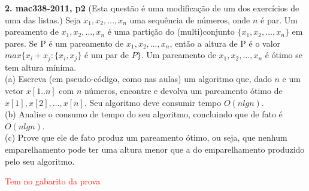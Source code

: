 
\noindent \textbf{2. mac338-2011, p2} (Esta questão é uma modificação de um dos exercícios de uma das listas.) Seja $x_1, x_2, \ldots , x_n$ uma sequência de números, onde $n$ é par. Um pareamento de $x_1, x_2, \ldots , x_n$ é uma partição do (multi)conjunto $\{x_1, x_2, \ldots , x_n\}$ em pares. Se P é um pareamento de $x_1, x_2, \ldots , x_n$, então a altura de P é o valor $max\{x_i+x_j : \{x_i, x_j\}$ é um par de $P\}$. Um pareamento de $x_1, x_2, \ldots , x_n$ é ótimo se tem altura mínima.\\[6pt]

\noindent (a) Escreva (em pseudo-código, como nas aulas) um algoritmo que, dado $n$ e um vetor $x[1..n]$ com $n$ números, encontre e devolva um pareamento ótimo de $x[1], x[2], \dots , x[n]$. Seu algoritmo deve
consumir tempo $O(n lg n)$.\\[2pt]
(b) Analise o consumo de tempo do seu algoritmo, concluindo que de fato é $O(n lg n)$.\\[2pt]
(c) Prove que ele de fato produz um pareamento ótimo, ou seja, que nenhum emparelhamento pode ter uma altura menor que a do emparelhamento produzido pelo seu algoritmo.

\textcolor{red}{Tem no gabarito da prova}